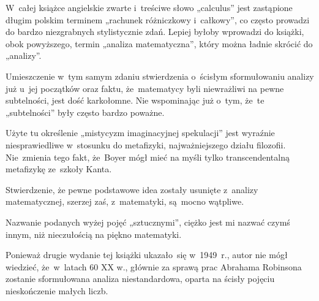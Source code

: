 \documentclass[a4paper,11pt]{article}
\numberwithin{equation}{section}
\begin{document}

\vspace{0em}


\noindent
W~całej książce angielskie zwarte i~treściwe słowo „calculus”
jest zastąpione długim polskim terminem „rachunek różniczkowy
i~całkowy”, co często prowadzi do bardzo niezgrabnych stylistycznie
zdań. Lepiej byłoby wprowadzi do książki, obok powyższego, termin
„analiza matematyczna”, który można ładnie skrócić do „analizy”.

\VerSpaceFour






\vspace{0em}


\noindent
{} Umieszczenie w~tym samym zdaniu stwierdzenia
o~ścisłym sformułowaniu analizy już u~jej początków oraz faktu,
że~matematycy byli niewrażliwi na pewne subtelności, jest dość
karkołomne. Nie wspominając już o~tym, że~te „subtelności” były
często bardzo poważne.

\VerSpaceFour





\noindent
{} Użyte tu określenie „mistycyzm imaginacyjnej
spekulacji” jest wyraźnie niesprawiedliwe w~stosunku do metafizyki,
najważniejszego działu filozofii. Nie~zmienia tego fakt, że~Boyer mógł
mieć na myśli tylko transcendentalną metafizykę ze~szkoły Kanta.

\VerSpaceFour





\noindent
{} Stwierdzenie, że pewne podstawowe idea zostały usunięte z~analizy
matematycznej, szerzej zaś, z~matematyki, są~mocno wątpliwe.

\vspace{\spaceFour}





\noindent
{} Nazwanie podanych wyżej pojęć „sztucznymi”, ciężko jest
mi nazwać czymś innym, niż nieczułością na piękno matematyki.

\vspace{\spaceFour}





\noindent
{} Ponieważ drugie wydanie tej książki ukazało~się w~1949~r.,
autor nie mógł wiedzieć, że~w~latach 60 XX w., głównie za sprawą
prac Abrahama Robinsona zostanie sformułowana analiza niestandardowa,
oparta na ścisły pojęciu nieskończenie małych liczb.
\end{document}
